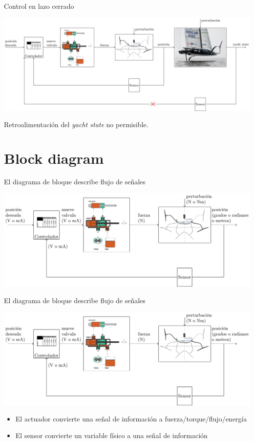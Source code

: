 \documentclass[presentation,aspectratio=169]{beamer}
\begin{document}
\begin{frame}[label={sec:org7fee771}]{Control en lazo cerrado}
\begin{center}
\includegraphics[width=1.02\textwidth]{../../figures/ac75-control-block-outer-feedback}
\end{center}

Retroalimentación del \emph{yacht state} \alert{no} permisible.
\end{frame}


\section{Block diagram}
\label{sec:org4554415}

\begin{frame}[label={sec:org5212a7f}]{El diagrama de bloque describe \alert{flujo de señales}}
\begin{center}
\includegraphics[width=1.0\textwidth]{../../figures/ac75-control-block-feedback-units}
\end{center}
\end{frame}


\begin{frame}[label={sec:org102fd58}]{El diagrama de bloque describe \alert{flujo de señales}}
\begin{center}
\includegraphics[width=.8\textwidth]{../../figures/ac75-control-block-feedback-units}
\end{center}


\begin{itemize}
\item El \alert{actuador} convierte una señal de información a fuerza/torque/flujo/energía
\item El \alert{sensor} convierte un variable físico a una señal de información
\end{itemize}
\end{frame}
\end{document}
